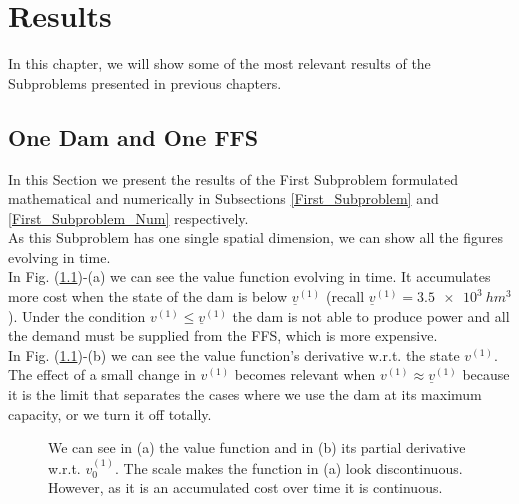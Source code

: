 \chapter{Results}

In this chapter, we will show some of the most relevant results of the Subproblems presented in previous chapters.

\section{One Dam and One FFS} \label{First_Subproblem_Results}

In this Section we present the results of the First Subproblem formulated mathematical and numerically in Subsections \ref{First_Subproblem} and \ref{First_Subproblem_Num} respectively.\\

As this Subproblem has one single spatial dimension, we can show all the figures evolving in time.\\

In Fig. (\ref{Plot_SP1_1})-(a) we can see the value function evolving in time. It accumulates more cost when the state of the dam is below $\underline{v}^{(1)}$ (recall $\underline{v}^{(1)}=\SI{3.5e3}{hm^3}$). Under the condition $v^{(1)}\leq\underline{v}^{(1)}$ the dam is not able to produce power and all the demand must be supplied from the FFS, which is more expensive.\\
In Fig. (\ref{Plot_SP1_1})-(b) we can see the value function's derivative w.r.t. the state $v^{(1)}$. The effect of a small change in $v^{(1)}$ becomes relevant when $v^{(1)}\approx\underline{v}^{(1)}$ because it is the limit that separates the cases where we use the dam at its maximum capacity, or we turn it off totally.

\begin{figure}[H]
\centering
{}\qquad
{}
\caption{We can see in (a) the value function and in (b) its partial derivative w.r.t. $v^{(1)}_0$. The scale makes the function in (a) look discontinuous. However, as it is an accumulated cost over time it is continuous.}
\label{Plot_SP1_1}
\end{figure}

